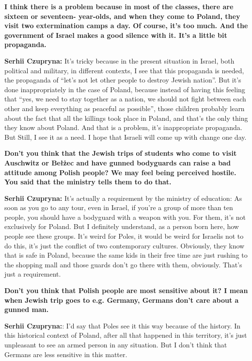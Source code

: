 \textbf{I think there is a problem because in most of the classes, there are sixteen or seventeen- year-olds, and when they come to Poland, they visit two extermination camps a day. Of course, it’s too much. And the government of Israel makes a good silence with it. It’s a little bit propaganda.}\par  
\textbf{Serhii Czupryna:} It’s tricky because in the present situation in Israel, both political and military, in different contexts, I see that this propaganda is needed, the propaganda of “let’s not let other people to destroy Jewish nation”. But it’s done inappropriately in the case of Poland, because instead of having this feeling that “yes, we need to stay together as a nation, we should not fight between each other and keep everything as peaceful as possible”, those children probably learn about the fact that all the killings took place in Poland, and that’s the only thing they know about Poland. And that is a problem, it’s inappropriate propaganda. But Still, I see it as a need. I hope that Israeli will come up with change one day. \par 
\textbf{Don’t you think that the Jewish trips of students who come to visit Auschwitz or Bełżec and have gunned bodyguards can raise a bad attitude among Polish people? We may feel being perceived hostile. You said that the ministry tells them to do that.}\par
\textbf{Serhii Czupryna:} It’s actually a requirement by the ministry of education: As soon as you go to any tour, even in Israel, if you’re a group of more than ten people, you should have a bodyguard with a weapon with you. For them, it’s not exclusively for Poland. But I definitely understand, as a person born here, how people see these groups. It’s weird for Poles, it would be weird for Israelis not to do this, it’s just the conflict of two contemporary cultures. Obviously, they know that is safe in Poland, because the same kids in their free time are just rushing to the shopping mall and those guards don’t go there with them, obviously. That’s just a requirement. \par
\textbf{Don’t you think that Polish people are most sensitive about it? I mean when Jewish trip goes to e.g. Germany, Germans don’t care about a gunned man.} \par
\textbf{Serhii Czupryna:}: I’d say that Poles see it this way because of the history. In this historical context of Poland, after all that happened in this territory, it’s just unpleasant to see an armed person in any situation. But I don’t think that Germans are less sensitive in this matter.\par
